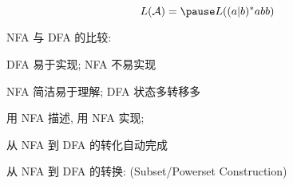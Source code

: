 \begin{frame}{}

  \[
    L(\mathcal{A}) = \pause L((a|b)^{\ast}abb)
  \]

  \pause
\end{frame}

\begin{frame}{}
  \begin{center}
    NFA 与 DFA 的比较:

    \vspace{0.80cm}
    DFA 易于实现; NFA 不易实现

    \vspace{0.30cm}
    NFA 简洁易于理解; DFA 状态多转移多

    \vspace{0.80cm}

    \vspace{0.30cm}
    用 NFA 描述, 用 NFA 实现; 

    \vspace{0.30cm}
    从 NFA 到 DFA 的转化自动完成
  \end{center}
\end{frame}

\begin{frame}{}
  \begin{center}
    从 NFA 到 DFA 的转换:  (Subset/Powerset Construction)

    \vspace{0.50cm}
    \begin{columns}
        \begin{center}
        \end{center}
        \begin{center}
        \end{center}
    \end{columns}
  \end{center}

  \vspace{0.20cm}
  \begin{center}
  \end{center}
\end{frame}

